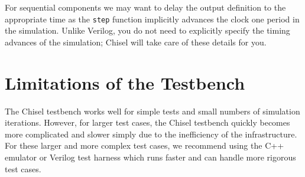 \documentclass[twocolumn, 10pt]{article}
\begin{document}
For sequential components we may want to delay the output definition to the appropriate time as the \verb+step+ function implicitly advances the clock one period in the simulation. Unlike Verilog, you do not need to explicitly specify the timing advances of the simulation; Chisel will take care of these details for you.

\section{Limitations of the Testbench}

The Chisel testbench works well for simple tests and small numbers of simulation iterations. However, for larger test cases, the Chisel testbench quickly becomes more complicated and slower simply due to the inefficiency of the infrastructure. For these larger and more complex test cases, we recommend using the C++ emulator or Verilog test harness which runs faster and can handle more rigorous test cases.
\end{document}
